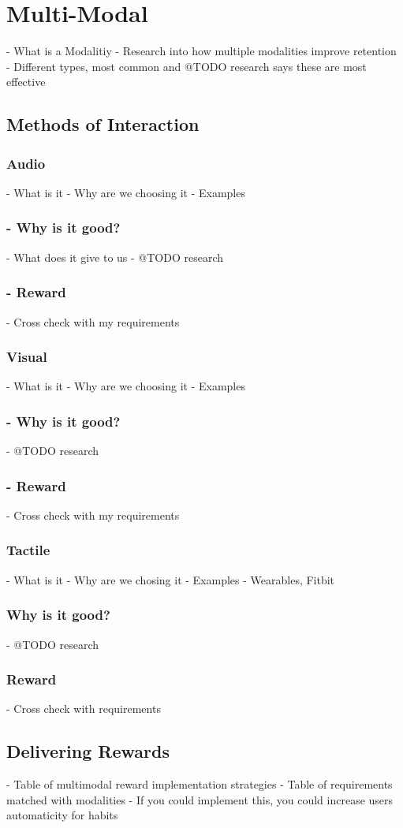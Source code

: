 
\newpage

\section{Multi-Modal}
  - What is a Modalitiy
  - Research into how multiple modalities improve retention
  - Different types, most common and @TODO research says these are most effective
  \subsection{Methods of Interaction}
  \subsubsection*{Audio}
      - What is it
      - Why are we choosing it
      - Examples
      \subsubsection*{- Why is it good?}
        - What does it give to us
        - @TODO research
      \subsubsection*{- Reward}
        - Cross check with my requirements
  \subsubsection*{Visual}
      - What is it
      - Why are we choosing it
      - Examples
      \subsubsection*{- Why is it good?}
        - @TODO research
      \subsubsection*{- Reward}
        - Cross check with my requirements
  \subsubsection*{Tactile}
      - What is it
      - Why are we chosing it
      - Examples
      - Wearables, Fitbit
    \subsubsection*{Why is it good?}
        - @TODO research
    \subsubsection*{Reward}
        - Cross check with requirements

  \subsection{Delivering Rewards}
    - Table of multimodal reward implementation strategies
    - Table of requirements matched with modalities
    - If you could implement this, you could increase users automaticity for habits

